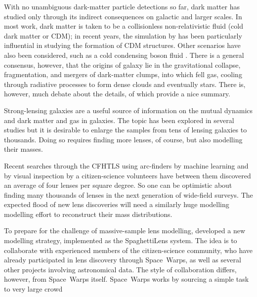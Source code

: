 \documentclass[fleqn,usenatbib]{mnras}
\begin{document}
With no unambiguous dark-matter particle detections so far, dark
matter has studied only through its indirect consequences on galactic
and larger scales.  In most work, dark matter is taken to be a
collisionless non-relativistic fluid (cold dark matter or CDM); in
recent years, the simulation by \cite{2005Natur.435..629S} has been
particularly influential in studying the formation of CDM structures.
Other scenarios have also been considered, such as a cold condensing
boson fluid \citep{2016ApJ...818...89S}.  There is a general
consensus, however, that the origins of galaxy lie in the
gravitational collapse, fragmentation, and mergers of dark-matter
clumps, into which fell gas, cooling through radiative processes to
form dense clouds and eventually stars.  There is, however, much
debate about the details, of which \cite{2012RAA....12..917S} provide
a nice summary.

Strong-lensing galaxies are a useful source of information on the
mutual dynamics and dark matter and gas in galaxies.  The topic has
been explored in several studies
\citep{2009ApJ...703L..51K,2011ApJ...740...97L,2012MNRAS.424..104L,
  2016MNRAS.459.3677L,2016MNRAS.456..870B} but it is desirable to
enlarge the samples from tens of lensing galaxies to thousands.  Doing
so requires finding more lenses, of course, but also modelling their
masses.

Recent searches through the CFHTLS \citep{2012SPIE.8448E..0MC} using
arc-finders
\citep{2012ApJ...749...38M,2014A&A...567A.111M,2014ApJ...785..144G} by
machine learning \citep{2016arXiv160504309P} and by visual inspection
by a citizen-science volunteers
\citep[Space~Warps][]{2016MNRAS.455.1191M} have between them
discovered an average of four lenses per square degree.  So one can be
optimistic about finding many thousands of lenses in the next
generation of wide-field surveys.  The expected flood of new lens
discoveries will need a similarly huge modelling modelling effort to
reconstruct their mass distributions.

To prepare for the challenge of massive-sample lens modelling,
\cite{2015MNRAS.447.2170K} developed a new modelling strategy,
implemented as the SpaghettiLens system.  The idea is to collaborate
with experienced members of the citizen-science community, who have
already participated in lens discovery through Space~Warps, as well as
several other projects involving astronomical data.  The style of
collaboration differs, however, from Space~Warps itself.  Space~Warps
works by sourcing a simple task to very large crowd
\end{document}

